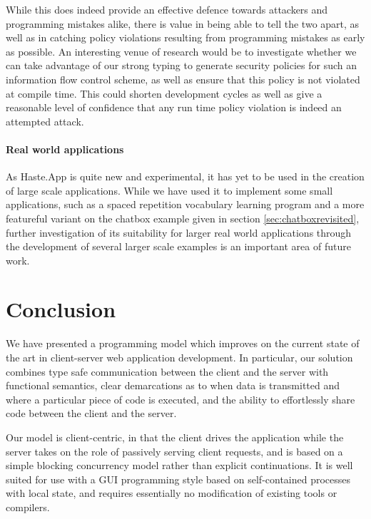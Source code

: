 \documentclass[preprint]{sigplanconf}
\begin{document}
While this does indeed provide an effective defence towards attackers and
programming mistakes alike, there is value in being able to tell the two apart,
as well as in catching policy violations resulting from programming mistakes
as early as possible. An interesting venue of research would be to investigate
whether we can take advantage of our strong typing to generate security policies
for such an information flow control scheme, as well as ensure that this policy
is not violated at compile time. This could shorten development cycles as well
as give a reasonable level of confidence that any run time policy violation is
indeed an attempted attack.

\paragraph{Real world applications} As Haste.App is quite new and experimental,
it has yet to be used in the creation of large scale applications. While we
have used it to implement some small applications, such as a spaced repetition
vocabulary learning program and a more featureful variant on the chatbox
example given in section \ref{sec:chatboxrevisited}, further investigation of
its suitability for larger real world applications through the development of
several larger scale examples is an important area of future work.

\section{Conclusion}

We have presented a programming model which improves on the current state of
the art in client-server web application development. In particular, our
solution combines type safe communication between the client and the server
with functional semantics, clear demarcations as to when data is transmitted
and where a particular piece of code is executed, and the ability to
effortlessly share code between the client and the server.

Our model is client-centric, in that the client drives the application while
the server takes on the role of passively serving client requests, and is based
on a simple blocking concurrency model rather than explicit continuations.
It is well suited for use with a GUI programming style based on
self-contained processes with local state, and requires essentially no
modification of existing tools or compilers.

\end{document}
